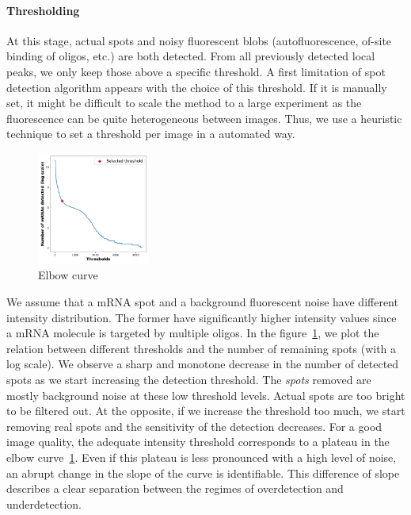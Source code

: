 
\paragraph{Thresholding}

At this stage, actual spots and noisy fluorescent blobs (autofluorescence, of-site binding of oligos, etc.) are both detected.
From all previously detected local peaks, we only keep those above a specific threshold.
A first limitation of spot detection algorithm appears with the choice of this threshold.
If it is manually set, it might be difficult to scale the method to a large experiment as the fluorescence can be quite heterogeneous between images.
Thus, we use a heuristic technique to set a threshold per image in a automated way.

\begin{figure}
  \begin{center}
    \includegraphics[width=0.33\textwidth]{figures/chapter2/elbow_curve_real}
  \end{center}
  \caption{Elbow curve}
  \label{fig:elbow_detection}
\end{figure}

We assume that a \ac{mRNA} spot and a background fluorescent noise have different intensity distribution.
The former have significantly higher intensity values since a \ac{mRNA} molecule is targeted by multiple oligos.
In the figure~\ref{fig:elbow_detection}, we plot the relation between different thresholds and the number of remaining spots (with a log scale).
We observe a sharp and monotone decrease in the number of detected spots as we start increasing the detection threshold.
The \emph{spots} removed are mostly background noise at these low threshold levels.
Actual spots are too bright to be filtered out.
At the opposite, if we increase the threshold too much, we start removing real spots and the sensitivity of the detection decreases.
For a good image quality, the adequate intensity threshold corresponds to a plateau in the elbow curve~\ref{fig:elbow_detection}.
Even if this plateau is less pronounced with a high level of noise, an abrupt change in the slope of the curve is identifiable.
This difference of slope describes a clear separation between the regimes of overdetection and underdetection.

